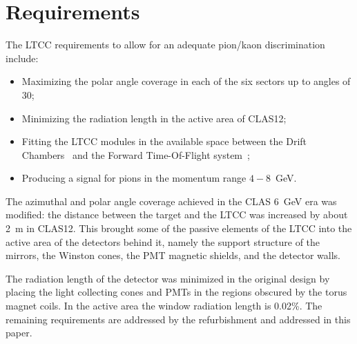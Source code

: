 \section{Requirements}

The LTCC requirements to allow for an adequate pion/kaon discrimination include:

\begin{itemize}
	\item Maximizing the polar angle coverage in each of the six sectors up to angles of 30\mdeg;
	\item Minimizing the radiation length in the active area of CLAS12;
	\item Fitting the LTCC modules in the available space between the Drift Chambers~\cite{dc-nim} and the Forward
          Time-Of-Flight system~\cite{ftof-nim};
	\item Producing a signal for pions in the momentum range $4-8$~GeV.
\end{itemize}

The azimuthal and polar angle coverage achieved in the CLAS 6~GeV era was modified: the
distance between the target and the LTCC was increased by about 2~m in CLAS12. This brought some of the passive
elements of the LTCC into the active area of the detectors behind it, namely the support structure of the mirrors, the
Winston cones, the PMT magnetic shields, and the detector walls.

The radiation length of the detector was minimized in the original design by placing the light collecting cones and PMTs in the regions
obscured by the torus magnet coils. In the active area the window radiation length is 0.02\%. The remaining
requirements are addressed by the refurbishment and addressed in this paper.

